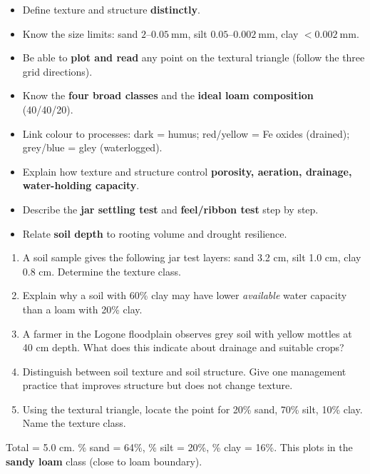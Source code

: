 \documentclass[11pt]{article}
\begin{document}
\begin{aretenir}
\begin{itemize}
\item Define texture and structure \textbf{distinctly}.
\item Know the size limits: sand $2$–$0.05\ \mathrm{mm}$, silt $0.05$–$0.002\ \mathrm{mm}$, clay $<0.002\ \mathrm{mm}$.
\item Be able to \textbf{plot and read} any point on the textural triangle (follow the three grid directions).
\item Know the \textbf{four broad classes} and the \textbf{ideal loam composition} (40/40/20).
\item Link colour to processes: dark = humus; red/yellow = Fe oxides (drained); grey/blue = gley (waterlogged).
\item Explain how texture and structure control \textbf{porosity, aeration, drainage, water-holding capacity}.
\item Describe the \textbf{jar settling test} and \textbf{feel/ribbon test} step by step.
\item Relate \textbf{soil depth} to rooting volume and drought resilience.
\end{itemize}
\end{aretenir}

\begin{exercice}
\begin{enumerate}
\item A soil sample gives the following jar test layers: sand 3.2 cm, silt 1.0 cm, clay 0.8 cm. Determine the texture class.
\item Explain why a soil with 60\% clay may have lower \emph{available} water capacity than a loam with 20\% clay.
\item A farmer in the Logone floodplain observes grey soil with yellow mottles at 40 cm depth. What does this indicate about drainage and suitable crops?
\item Distinguish between soil texture and soil structure. Give one management practice that improves structure but does not change texture.
\item Using the textural triangle, locate the point for 20\% sand, 70\% silt, 10\% clay. Name the texture class.
\end{enumerate}
\end{exercice}

\begin{corrige}[Exercise 1]
Total = 5.0 cm. \% sand = 64\%, \% silt = 20\%, \% clay = 16\%. This plots in the \textbf{sandy loam} class (close to loam boundary).
\end{corrige}
\end{document}
